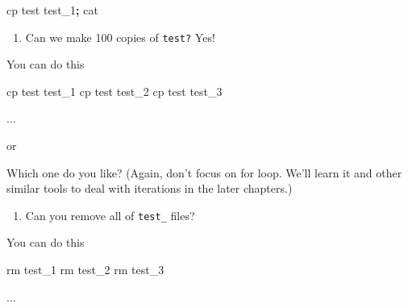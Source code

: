 \documentclass[
]{book}
\newenvironment{Shaded}{\begin{snugshade}}{\end{snugshade}}
\newcommand{\ControlFlowTok}[1]{\textcolor[rgb]{0.13,0.29,0.53}{\textbf{#1}}}
\newcommand{\ExtensionTok}[1]{#1}
\newcommand{\FunctionTok}[1]{\textcolor[rgb]{0.00,0.00,0.00}{#1}}
\newcommand{\KeywordTok}[1]{\textcolor[rgb]{0.13,0.29,0.53}{\textbf{#1}}}
\newcommand{\NormalTok}[1]{#1}
\newcommand{\StringTok}[1]{\textcolor[rgb]{0.31,0.60,0.02}{#1}}
\newcommand{\VariableTok}[1]{\textcolor[rgb]{0.00,0.00,0.00}{#1}}
\providecommand{\tightlist}{%
  \setlength{\itemsep}{0pt}\setlength{\parskip}{0pt}}
\begin{document}
\begin{Shaded}
\begin{Highlighting}[]

\FunctionTok{cp}\NormalTok{ test test\_1}\KeywordTok{;} \FunctionTok{cat} 
\end{Highlighting}
\end{Shaded}

\begin{enumerate}
\def\labelenumi{\arabic{enumi}.}
\setcounter{enumi}{1}
\tightlist
\item
  Can we make 100 copies of \texttt{test?} Yes!
\end{enumerate}

You can do this

\begin{Shaded}
\begin{Highlighting}[]

\FunctionTok{cp}\NormalTok{ test test\_1 }
\FunctionTok{cp}\NormalTok{ test test\_2}
\FunctionTok{cp}\NormalTok{ test test\_3 }

\ExtensionTok{...} 
\end{Highlighting}
\end{Shaded}

or

\begin{Shaded}
\end{Shaded}

Which one do you like? (Again, don't focus on for loop. We'll learn it and other similar tools to deal with iterations in the later chapters.)

\begin{enumerate}
\def\labelenumi{\arabic{enumi}.}
\setcounter{enumi}{2}
\tightlist
\item
  Can you remove all of \texttt{test\_} files?
\end{enumerate}

You can do this

\begin{Shaded}
\begin{Highlighting}[]
\FunctionTok{rm}\NormalTok{ test\_1}
\FunctionTok{rm}\NormalTok{ test\_2}
\FunctionTok{rm}\NormalTok{ test\_3 }

\ExtensionTok{...}
\end{Highlighting}
\end{Shaded}
\end{document}
